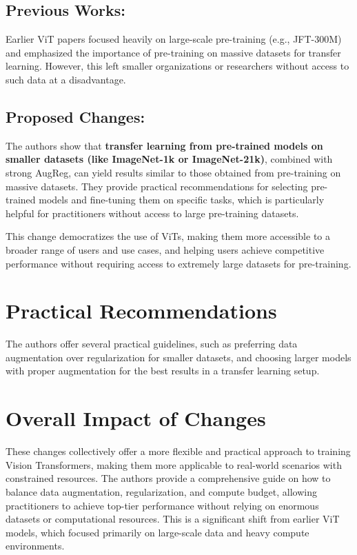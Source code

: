 \documentclass{report}
\begin{document}
	\subsection{Previous Works:}
	Earlier ViT papers focused heavily on large-scale pre-training (e.g., JFT-300M) and emphasized the importance of pre-training on massive datasets for transfer learning. However, this left smaller organizations or researchers without access to such data at a disadvantage.
	
	
	\subsection{Proposed Changes:}
	The authors show that \textbf{transfer learning from pre-trained models on smaller datasets (like ImageNet-1k or ImageNet-21k)}, combined with strong AugReg, can yield results similar to those obtained from pre-training on massive datasets. They provide practical recommendations for selecting pre-trained models and fine-tuning them on specific tasks, which is particularly helpful for practitioners without access to large pre-training datasets.
	
	
	This change democratizes the use of ViTs, making them more accessible to a broader range of users and use cases, and helping users achieve competitive performance without requiring access to extremely large datasets for pre-training.
	
	
	\section{Practical Recommendations}
	The authors offer several practical guidelines, such as preferring data augmentation over regularization for smaller datasets, and choosing larger models with proper augmentation for the best results in a transfer learning setup.
	
	
	
	
	\section{Overall Impact of Changes}
	These changes collectively offer a more flexible and practical approach to training Vision Transformers, making them more applicable to real-world scenarios with constrained resources. The authors provide a comprehensive guide on how to balance data augmentation, regularization, and compute budget, allowing practitioners to achieve top-tier performance without relying on enormous datasets or computational resources. This is a significant shift from earlier ViT models, which focused primarily on large-scale data and heavy compute environments.
	
\end{document}

